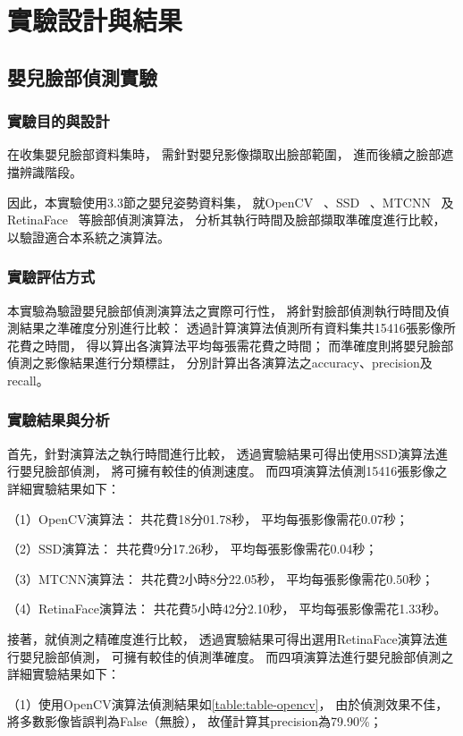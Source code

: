 \documentclass[class=NCU_thesis, crop=false]{standalone}
\begin{document}
\chapter{實驗設計與結果}

\section{嬰兒臉部偵測實驗}
\subsection{實驗目的與設計}
在收集嬰兒臉部資料集時，
需針對嬰兒影像擷取出臉部範圍，
進而後續之臉部遮擋辨識階段。

因此，本實驗使用3.3節之嬰兒姿勢資料集，
就OpenCV~\cite{goyal_face_2017}
、SSD~\cite{ye_face_2021}
、MTCNN~\cite{zhang_joint_2016}
及RetinaFace~\cite{deng_retinaface_2020}
等臉部偵測演算法，
分析其執行時間及臉部擷取準確度進行比較，
以驗證適合本系統之演算法。

\subsection{實驗評估方式}
本實驗為驗證嬰兒臉部偵測演算法之實際可行性，
將針對臉部偵測執行時間及偵測結果之準確度分別進行比較：
透過計算演算法偵測所有資料集共15416張影像所花費之時間，
得以算出各演算法平均每張需花費之時間；
而準確度則將嬰兒臉部偵測之影像結果進行分類標註，
分別計算出各演算法之accuracy、precision及recall。

\subsection{實驗結果與分析}
首先，針對演算法之執行時間進行比較，
透過實驗結果可得出使用SSD演算法進行嬰兒臉部偵測，
將可擁有較佳的偵測速度。
而四項演算法偵測15416張影像之詳細實驗結果如下：

（1）OpenCV演算法：
共花費18分01.78秒，
平均每張影像需花0.07秒；

（2）SSD演算法：
共花費9分17.26秒，
平均每張影像需花0.04秒；

（3）MTCNN演算法：
共花費2小時8分22.05秒，
平均每張影像需花0.50秒；

（4）RetinaFace演算法：
共花費5小時42分2.10秒，
平均每張影像需花1.33秒。

接著，就偵測之精確度進行比較，
透過實驗結果可得出選用RetinaFace演算法進行嬰兒臉部偵測，
可擁有較佳的偵測準確度。
而四項演算法進行嬰兒臉部偵測之詳細實驗結果如下：

（1）使用OpenCV演算法偵測結果如\cref{table:table-opencv}，
由於偵測效果不佳，
將多數影像皆誤判為False（無臉），
故僅計算其precision為79.90\%；
\end{document}
